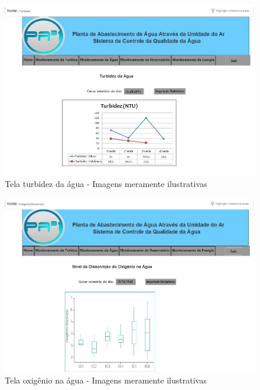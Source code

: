 \begin{center}
\begin{figure}[!ht]
\centering
\includegraphics[scale=0.5]{figuras/6}
\caption[Tela turbidez da água]{Tela turbidez da água - Imagens meramente ilustrativas}
\label{tela_turbidez_da_agua}
\end{figure}
\clearpage

\begin{figure}[!ht]
\centering
\includegraphics[scale=0.5]{figuras/7}
\caption[Tela oxigênio na água]{Tela oxigênio na água - Imagens meramente ilustrativas}
\label{tela_oxigenio_na_agua}
\end{figure}



\end{center}
